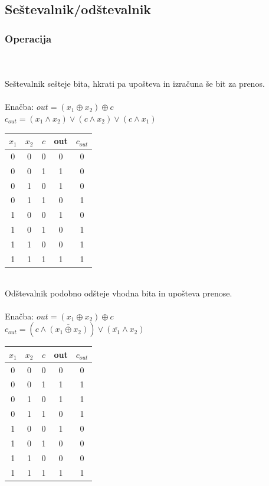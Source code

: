\documentclass[seminar, slovene]{FRIreport}
\begin{document}
\subsection{Seštevalnik/odštevalnik}
\subsubsection{Operacija}\ \\ \ \\
Seštevalnik sešteje bita, hkrati pa upošteva in izračuna še bit za prenos.
\ \\ \ \\
Enačba: $ out = (x_1 \oplus x_2) \oplus c$\\
$c_{out} = (x_1 \wedge x_2) \vee (c \wedge x_2) \vee (c \wedge x_1) $
\begin{table}[H]
\begin{tabular}{ | c | c | c || c | c | }\hline
$x_1$ & $x_2$ & $c$ & out & $c_{out}$ \\ \hline
0 & 0 & 0 & 0 & 0\\
0 & 0 & 1 & 1 & 0\\
0 & 1 & 0 & 1 & 0\\
0 & 1 & 1 & 0 & 1\\
1 & 0 & 0 & 1 & 0\\
1 & 0 & 1 & 0 & 1\\
1 & 1 & 0 & 0 & 1\\
1 & 1 & 1 & 1 & 1\\ \hline
\end{tabular}
\end{table}
\ \\
Odštevalnik podobno odšteje vhodna bita in upošteva prenose.
\ \\ \ \\
Enačba: $ out = (x_1 \oplus x_2) \oplus c$\\
$c_{out} = (c \wedge \overline{(x_1 \oplus x_2)}) \vee (\overline{x_1} \wedge x_2) $
\begin{table}[H]
\begin{tabular}{ | c | c | c || c | c | }\hline
$x_1$ & $x_2$ & $c$ & out & $c_{out}$ \\ \hline
0 & 0 & 0 & 0 & 0\\
0 & 0 & 1 & 1 & 1\\
0 & 1 & 0 & 1 & 1\\
0 & 1 & 1 & 0 & 1\\
1 & 0 & 0 & 1 & 0\\
1 & 0 & 1 & 0 & 0\\
1 & 1 & 0 & 0 & 0\\
1 & 1 & 1 & 1 & 1\\ \hline
\end{tabular}
\end{table}
\end{document}
